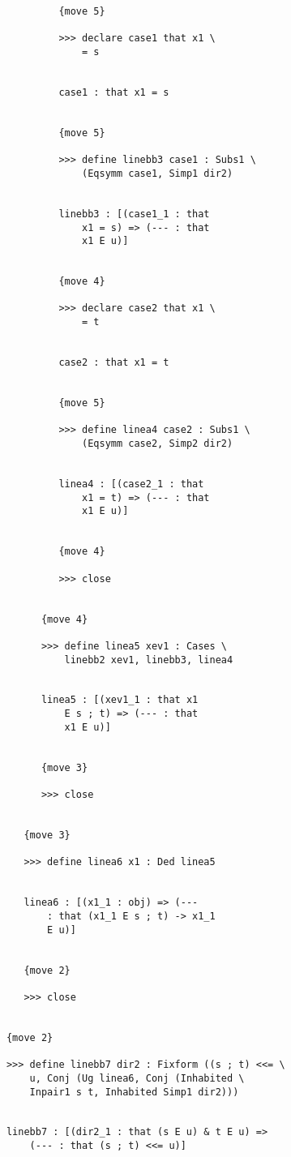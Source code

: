 \documentclass[12pt]{article}
\begin{document}
\begin{verbatim}
               {move 5}

               >>> declare case1 that x1 \
                   = s


               case1 : that x1 = s


               {move 5}

               >>> define linebb3 case1 : Subs1 \
                   (Eqsymm case1, Simp1 dir2)


               linebb3 : [(case1_1 : that 
                   x1 = s) => (--- : that 
                   x1 E u)]


               {move 4}

               >>> declare case2 that x1 \
                   = t


               case2 : that x1 = t


               {move 5}

               >>> define linea4 case2 : Subs1 \
                   (Eqsymm case2, Simp2 dir2)


               linea4 : [(case2_1 : that 
                   x1 = t) => (--- : that 
                   x1 E u)]


               {move 4}

               >>> close


            {move 4}

            >>> define linea5 xev1 : Cases \
                linebb2 xev1, linebb3, linea4


            linea5 : [(xev1_1 : that x1 
                E s ; t) => (--- : that 
                x1 E u)]


            {move 3}

            >>> close


         {move 3}

         >>> define linea6 x1 : Ded linea5


         linea6 : [(x1_1 : obj) => (--- 
             : that (x1_1 E s ; t) -> x1_1 
             E u)]


         {move 2}

         >>> close


      {move 2}

      >>> define linebb7 dir2 : Fixform ((s ; t) <<= \
          u, Conj (Ug linea6, Conj (Inhabited \
          Inpair1 s t, Inhabited Simp1 dir2)))


      linebb7 : [(dir2_1 : that (s E u) & t E u) => 
          (--- : that (s ; t) <<= u)]



\end{verbatim}
\end{document}
